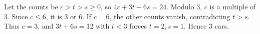 Let the counts be $c>t>s\ge0$, so $4c+3t+6s=24$. Modulo 3, $c$ is a multiple of 3. Since $c\le6$, it is 3 or 6. If $c=6$, the other counts vanish, contradicting $t>s$. Thus $c=3$, and $3t+6s=12$ with $t<3$ forces $t=2,s=1$. Hence $\boxed3$ cars.

